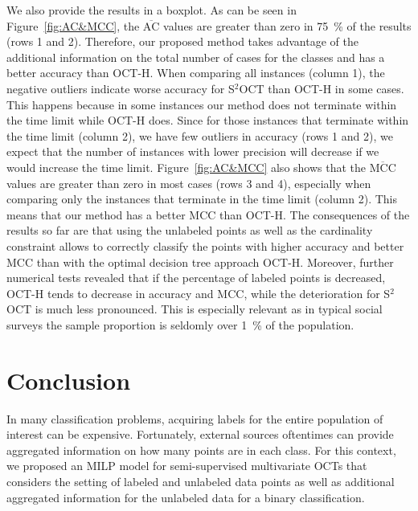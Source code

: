 \documentclass[a4paper,american,reqno]{amsart}
\newcommand{\AC}{\text{AC}}
\newcommand{\MCC}{\text{MCC}}
\newcommand{\rev}[1]{#1}
\begin{document}
\rev{We also provide the results in a boxplot.}
As can be seen in Figure~\ref{fig:AC&MCC}, the  $\overline{\AC}$
values  are greater than zero in  \SI{75}{\percent} of the results
(rows 1 and 2). Therefore, our proposed method takes advantage of
the additional information on the total number of cases for the
classes and has a better accuracy than OCT-H.
When comparing all instances (column 1), the negative outliers
indicate worse accuracy for S$^2$OCT than OCT-H in some cases. This
happens because in some instances our method does
not terminate within the time limit while OCT-H does. Since for those
instances that terminate within the time limit (column 2), we have few
outliers in accuracy (rows 1 and 2), we expect that the number of
instances with lower precision will decrease if we would increase the time
limit.
Figure~\ref{fig:AC&MCC} also shows that the $\overline{\MCC}$ values
are greater than zero in most cases (rows 3 and 4),  especially when
comparing only the instances that terminate in the time limit (column
2).   This means that our method has a better $\MCC$ than OCT-H. The
consequences of the results so far are that using the unlabeled points
as well as the cardinality
constraint allows to correctly classify the points with higher
accuracy and better $\MCC$ than with the optimal decision tree
approach OCT-H. Moreover, further numerical tests revealed that if
the percentage of labeled points is decreased, OCT-H tends to decrease
in accuracy and $\MCC$, while the deterioration for S$^2$OCT is much
less pronounced. This is especially relevant as in typical social
surveys the sample proportion is seldomly over \SI{1}{\percent} of the
population.



\section{Conclusion}
\label{sec:conclusion}

In many classification problems, acquiring labels for the entire
population of interest can be expensive.
Fortunately, external sources oftentimes can provide aggregated
information on how many points are in each class.
For this context, we proposed an MILP model for semi-supervised
multivariate OCTs that considers the setting of labeled and unlabeled
data points as well as additional aggregated information for the
unlabeled data for a binary classification.
\end{document}
